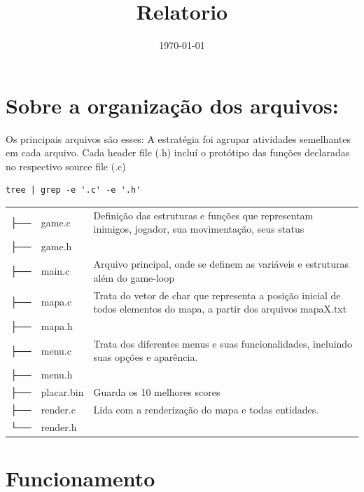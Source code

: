 \documentclass[11pt]{article}
\date{\today}
\title{Relatorio}
\begin{document}
\maketitle
\tableofcontents

\section{Sobre a organização dos arquivos:}
\label{sec:org833295a}


Os principais arquivos são esses:
A estratégia foi agrupar atividades semelhantes em cada arquivo.
Cada header file (.h) incluí o protótipo das funções declaradas no respectivo source file (.c)

\begin{verbatim}
tree | grep -e '.c' -e '.h'
\end{verbatim}

\begin{center}
\begin{tabular}{l l p{10cm}}
├── & game.c & Definição das estruturas e funções que representam inimigos, jogador, sua movimentação, seus status\\
├── & game.h & \\
├── & main.c & Arquivo principal, onde se definem as variáveis e estruturas além do game-loop\\
├── & mapa.c & Trata do vetor de char que representa a posição inicial de todos elementos do mapa, a partir dos arquivos mapaX.txt\\
├── & mapa.h & \\
├── & menu.c & Trata dos diferentes menus e suas funcionalidades, incluindo suas opções e aparência.\\
├── & menu.h & \\
├── & placar.bin & Guarda os 10 melhores scores\\
├── & render.c & Lida com a renderização do mapa e todas entidades.\\
└── & render.h & \\
\end{tabular}
\end{center}
\section{Funcionamento}
\label{sec:org7154cbd}
\end{document}
